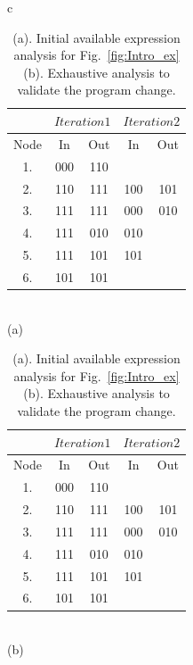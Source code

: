 \documentclass[11pt,a4paper,openright]{report}
\begin{document}
\begin{table}[H]
  \begin{center}
    \begin{tabular}{c}
    \begin{minipage}[b]{0.45\linewidth}\centering 
    \begin{tabular}{c c c c c }
    	\hline
    	   & \multicolumn{2}{c}{$Iteration 1$} & \multicolumn{2}{c}{$Iteration 2$}  \\
    	\hline
    	  Node & In & Out & In & Out \\
   		\midrule
   			  1. & 000 & 110 &  &    \\
   			  2. & 110 & 111 & 100 & 101  \\
   			  3. & 111 & 111 & 000 & 010   \\
   			  4. & 111 & 010 & 010 &   \\
   			  5. & 111 & 101 & 101 &    \\
   			  6. & 101 & 101 & &   \\
	      \bottomrule 
	    \end{tabular}
    	\\
  
	    (a)
    	    	
	\end{minipage}
	\hspace{0.5cm}
	\begin{minipage}[b]{0.45\linewidth}
	\centering
	
    	\begin{tabular}{c c c c c }
    	\hline
    	   & \multicolumn{2}{c}{$Iteration 1$} & \multicolumn{2}{c}{$Iteration 2$}  \\
    	\hline
    	  Node & In & Out & In & Out \\
   		\midrule
   			  1. & 000 & 110 &  &    \\
   			  2. & 110 & 111 & 100 & 101  \\
   			  3. & 111 & 111 & 000 & 010   \\
   			  4. & 111 & 010 & 010 &   \\
   			  5. & 111 & 101 & 101 &    \\
   			  6. & 101 & 101 & &   \\
	      \bottomrule 
	    \end{tabular}	
    	\\
    	
	(b)
    	
    	\end{minipage}
    	
	\end{tabular}    
    \caption[Motivating example for incremental analysis]{(a). Initial available expression analysis for Fig.~\ref{fig:Intro_ex} (b). Exhaustive analysis to validate the program change.}
      \label{tab:Initial Available_exp}
  \end{center}
\end{table}
\end{document}
